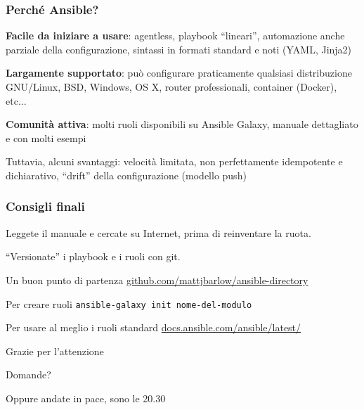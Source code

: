 \documentclass{beamer}
\begin{document}
\begin{frame}
\frametitle{Perché Ansible?}

\textbf{Facile da iniziare a usare}: agentless, playbook ``lineari'', automazione anche parziale della configurazione, sintassi in formati standard e noti (YAML, Jinja2)

\textbf{Largamente supportato}: può configurare praticamente qualsiasi distribuzione GNU/Linux, BSD, Windows, OS X, router professionali, container (Docker), etc...

\textbf{Comunità attiva}: molti ruoli disponibili su Ansible Galaxy, manuale dettagliato e con molti esempi

Tuttavia, alcuni svantaggi: velocità limitata, non perfettamente idempotente e dichiarativo, ``drift'' della configurazione (modello push)

\end{frame}

\begin{frame}
\frametitle{Consigli finali}

Leggete il manuale e cercate su Internet, prima di reinventare la ruota.

``Versionate'' i playbook e i ruoli con git.

\vspace{1em}

\begin{alertblock}{Un buon punto di partenza}
	\href{https://github.com/mattjbarlow/ansible-directory}{github.com/mattjbarlow/ansible-directory}
\end{alertblock}

\begin{alertblock}{Per creare ruoli}
	\texttt{ansible-galaxy init nome-del-modulo}
\end{alertblock}

\begin{alertblock}{Per usare al meglio i ruoli standard}
	\href{https://docs.ansible.com/ansible/latest/}{docs.ansible.com/ansible/latest/}
\end{alertblock}

\end{frame}

\begin{frame}

{\Huge Grazie per l'attenzione}

\end{frame}

\begin{frame}

{\Huge Domande?}

\vspace{2em}

Oppure andate in pace, sono le 20.30

\end{frame}
\end{document}
